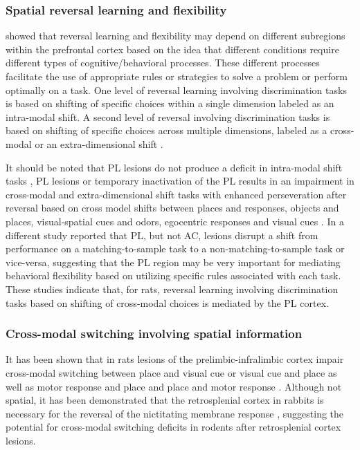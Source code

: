 \documentclass[doc, longtable]{apa6}
\begin{document}
\subsubsection{Spatial reversal learning and flexibility}
\textcite{Kesner2011a} showed that reversal learning and flexibility may depend on different subregions within the prefrontal cortex based on the idea that different conditions require different types of cognitive/behavioral processes. These different processes facilitate the use of appropriate rules or strategies to solve a problem or perform optimally on a task. One level of reversal learning involving discrimination tasks is based on shifting of specific choices within a single dimension labeled as an intra-modal shift. A second level of reversal involving discrimination tasks is based on shifting of specific choices across multiple dimensions, labeled as a cross-modal or an extra-dimensional shift \parencite{Wise1996a}.

It should be noted that PL lesions do not produce a deficit in intra-modal shift tasks \parencite{Chudasama2003a, McAlonan2003a}, PL lesions or temporary inactivation of the PL results in an impairment in cross-modal and extra-dimensional shift tasks with enhanced perseveration after reversal based on cross model shifts between places and responses, objects and places, visual-spatial cues and odors, egocentric responses and visual cues \parencite{Floresco2008a, Ragozzino1999c, Ragozzino1999b, Ragozzino2003a, Stefani2003a}. In a different study \textcite{Dias1996a} reported that PL, but not AC, lesions disrupt a shift from performance on a matching-to-sample task to a non-matching-to-sample task or vice-versa, suggesting that the PL region may be very important for mediating behavioral flexibility based on utilizing specific rules associated with each task. These studies indicate that, for rats, reversal learning involving discrimination tasks based on shifting of cross-modal choices is mediated by the PL cortex. 

\subsubsection{Cross-modal switching involving spatial information}
It has been shown that in rats lesions of the prelimbic-infralimbic cortex impair cross-modal switching between place and visual cue or visual cue and place as well as motor response and place and place and motor response \parencite{Ragozzino1999d, Ragozzino1999c, Ragozzino1999b}. Although not spatial, it has been demonstrated that the retrosplenial cortex in rabbits is necessary for the reversal of the nictitating membrane response \parencite{Berger1986a}, suggesting the potential for cross-modal switching deficits in rodents after retrosplenial cortex lesions.
\end{document}
